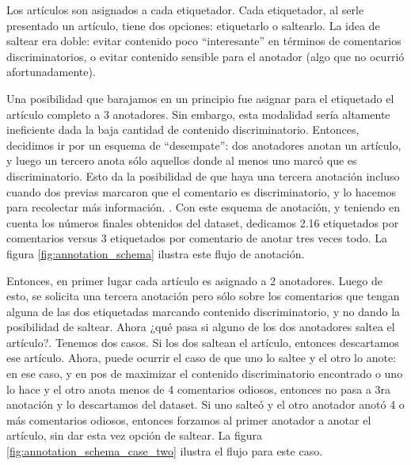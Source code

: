 Los artículos son asignados a cada etiquetador. Cada etiquetador, al serle presentado un artículo, tiene dos opciones: etiquetarlo o saltearlo. La idea de saltear era doble: evitar contenido poco ``interesante'' en términos de comentarios discriminatorios, o evitar contenido sensible para el anotador (algo que no ocurrió afortunadamente).

Una posibilidad que barajamos en un principio fue asignar para el etiquetado el artículo completo a 3 anotadores. Sin embargo, esta modalidad sería altamente ineficiente dada la baja cantidad de contenido discriminatorio. Entonces, decidimos ir por un esquema de ``desempate'': dos anotadores anotan un artículo, y luego un tercero anota sólo aquellos donde al menos uno marcó que es discriminatorio. Esto da la posibilidad de que haya una tercera anotación incluso cuando dos previas marcaron que el comentario es discriminatorio, y lo hacemos para recolectar más información. . Con este esquema de anotación, y teniendo en cuenta los números finales obtenidos del dataset, dedicamos 2.16 etiquetados por comentarios versus 3 etiquetados por comentario de anotar tres veces todo. La figura \ref{fig:annotation_schema} ilustra este flujo de anotación.

Entonces, en primer lugar cada artículo es asignado a 2 anotadores. Luego de esto, se solicita una tercera anotación pero sólo sobre los comentarios que tengan alguna de las dos etiquetadas marcando contenido discriminatorio, y no dando la posibilidad de saltear. Ahora ¿qué pasa si alguno de los dos anotadores saltea el artículo?. Tenemos dos casos. Si los dos saltean el artículo, entonces descartamos ese artículo. Ahora, puede ocurrir el caso de que uno lo saltee y el otro lo anote: en ese caso, y en pos de maximizar el contenido discriminatorio encontrado o uno lo hace y el otro anota menos de 4 comentarios odiosos, entonces no pasa a 3ra anotación y lo descartamos del dataset. Si uno salteó y el otro anotador anotó 4 o más comentarios odiosos, entonces forzamos al primer anotador a anotar el artículo, sin dar esta vez opción de saltear. La figura \ref{fig:annotation_schema_case_two} ilustra el flujo para este caso.



